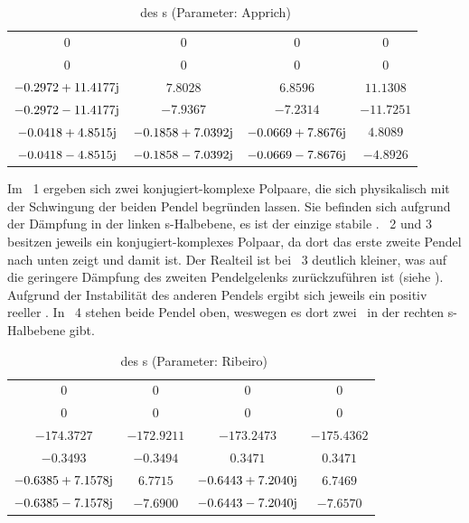 \begin{table}[htbp]
	\centering
	\caption{\ewe\ des \bss s (Parameter: Apprich)}
		\begin{tabular}[t]{cccc}
			\toprule
			\ape & \apz & \apd & \apv \\
			\midrule
			$0$	&	$0$	&	$0$	&	$0$	\\
			$0$	&	$0$	&	$0$	&	$0$	\\
			$-0.2972 +11.4177\mathrm{j}$ &    $7.8028						$	&	  $6.8596							$	&   $11.1308$	\\
			$-0.2972 -11.4177\mathrm{j}$ &   $-7.9367						$	&   $-7.2314					$		&  $-11.7251$	\\
			$-0.0418 + 4.8515\mathrm{j}$ &   $-0.1858 + 7.0392\mathrm{j}$	&  $-0.0669 + 7.8676\mathrm{j}$	&  $  4.8089$	\\
			$-0.0418 - 4.8515\mathrm{j}$ &   $-0.1858 - 7.0392\mathrm{j}$	& $ -0.0669 - 7.8676\mathrm{j}	$	&  $ -4.8926$	\\
			\bottomrule
		\end{tabular}
	\label{tab:ewappr}
\end{table}
Im \ap\ 1 ergeben sich zwei konjugiert-komplexe Polpaare, die sich physikalisch mit der Schwingung der beiden Pendel begründen lassen. Sie befinden sich aufgrund der Dämpfung in der linken s-Halbebene, es ist der einzige stabile \ap. \ap\ 2 und 3 besitzen jeweils ein konjugiert-komplexes Polpaar, da dort das erste \bzw zweite Pendel nach unten zeigt und damit  ist. Der Realteil ist bei \ap\ 3 deutlich kleiner, was auf die geringere Dämpfung des zweiten Pendelgelenks zurückzuführen ist (siehe ). Aufgrund der Instabilität des anderen Pendels ergibt sich jeweils ein positiv reeller \ew. In \ap\ 4 stehen beide Pendel oben, weswegen es dort zwei \ewe\ in der rechten s-Halbebene gibt.

\begin{table}[htbp]
	\centering
	\caption{\ewe\ des \bss s (Parameter: Ribeiro)}
		\begin{tabular}[t]{cccc}
			\toprule
			\ape & \apz & \apd & \apv \\
			\midrule
				$0$	&	$0$	&	$0$	&	$0$	\\
				$0$	&	$0$	&	$0$	&	$0$	\\
				$-174.3727$						&	$-172.9211$	&	$-173.2473$						&	$-175.4362$	\\
				$-0.3493$							&	$-0.3494$		&	$0.3471$							&	$0.3471$	\\
				$-0.6385 + 7.1578\mathrm{j}$	&	$6.7715$		&	$-0.6443 + 7.2040\mathrm{j}$	&	$6.7469$	\\
				$-0.6385 - 7.1578\mathrm{j}$	&	$-7.6900$ 	&	$-0.6443 - 7.2040\mathrm{j}$ &	$-7.6570$ \\
			\bottomrule
		\end{tabular}
	\label{tab:ewribe}
\end{table}

